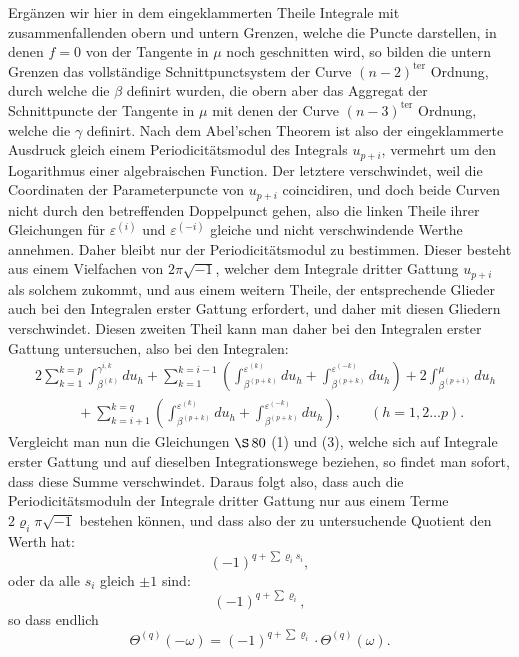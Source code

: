 \documentclass[10pt]{article}
\begin{document}
Ergänzen wir hier in dem eingeklammerten Theile Integrale mit zusammenfallenden obern und untern Grenzen, welche die Puncte darstellen, in denen \(f=0\) von der Tangente in \(\mu\) noch geschnitten wird, so bilden die untern Grenzen das vollständige Schnittpunctsystem der Curve \((n-2)^{\mathrm{ter}}\) Ordnung, durch welche die \(\beta\) definirt wurden, die obern aber das Aggregat der Schnittpuncte der Tangente in \(\mu\) mit denen der Curve \((n-3)^{\mathrm{ter}}\) Ordnung, welche die \(\gamma\) definirt. Nach dem Abel'schen Theorem ist also der eingeklammerte Ausdruck gleich einem Periodicitätsmodul des Integrals \(u_{p+i}\), vermehrt um den Logarithmus einer algebraischen Function. Der letztere verschwindet, weil die Coordinaten der Parameterpuncte von \(u_{p+i}\) coincidiren, und doch beide Curven nicht durch den betreffenden Doppelpunct gehen, also die linken Theile ihrer Gleichungen für \(\varepsilon^{(i)}\) und \(\varepsilon^{(-i)}\) gleiche und nicht verschwindende Werthe annehmen. Daher bleibt nur der Periodicitätsmodul zu bestimmen. Dieser besteht aus einem Vielfachen von \(2\pi\sqrt{-1}\), welcher dem Integrale dritter Gattung \(u_{p+i}\) als solchem zukommt, und aus einem weitern Theile, der entsprechende Glieder auch bei den Integralen erster Gattung erfordert, und daher mit diesen Gliedern verschwindet. Diesen zweiten Theil kann man daher bei den Integralen erster Gattung untersuchen, also bei den Integralen:
\[
\begin{aligned}
&2\sum_{k=1}^{k=p}\int_{\beta^{(k)}}^{\gamma^{i,k}}du_h
+\sum_{k=1}^{k=i-1}\left(\int_{\beta^{(p+k)}}^{\varepsilon^{(k)}}du_h
+\int_{\beta^{(p+k)}}^{\varepsilon^{(-k)}}du_h\right)
+2\int_{\beta^{(p+i)}}^{\mu}du_h\\
&\hspace{3em}
+\sum_{k=i+1}^{k=q}\left(\int_{\beta^{(p+k)}}^{\varepsilon^{(k)}}du_h
+\int_{\beta^{(p+k)}}^{\varepsilon^{(-k)}}du_h\right),
\qquad (h=1,2\ldots p).
\end{aligned}
\]
Vergleicht man nun die Gleichungen \(\S\,80\) (1) und (3), welche sich auf Integrale erster Gattung und auf dieselben Integrationswege beziehen, so findet man sofort, dass diese Summe verschwindet. Daraus folgt also, dass auch die Periodicitätsmoduln der Integrale dritter Gattung nur aus einem Terme \(2\varrho_i\pi\sqrt{-1}\) bestehen können, und dass also der zu untersuchende Quotient den Werth hat:
\[
(-1)^{q+\sum\varrho_i s_i},
\]
oder da alle \(s_i\) gleich \(\pm1\) sind:
\[
(-1)^{q+\sum\varrho_i},
\]
so dass endlich
\[
\Theta^{(q)}(-\omega)=(-1)^{q+\sum\varrho_i}\cdot\Theta^{(q)}(\omega).
\]
\end{document}
